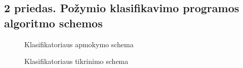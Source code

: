 \documentclass[]{vgtuef}
\begin{document}
\subsection*{2 priedas. Požymio klasifikavimo programos algoritmo schemos}
\label{subsec:class_stuff}

\begin{figure}[H]
  \centering
  
  \caption{Klasifikatoriaus apmokymo schema}
  \label{fig:class_train}
\end{figure}

\begin{figure}[H]
  \centering
  
  \caption{Klasifikatoriaus tikrinimo schema}
  \label{fig:class_test}
\end{figure}
\end{document}

